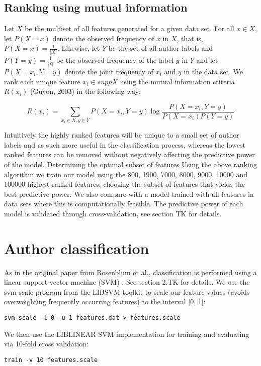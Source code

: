 \documentclass[a4paper,11pt]{kth-mag}
\begin{document}
\subsection{Ranking using mutual information}
Let $X$ be the multiset of all features generated for a given data set. For all
$x \in X$, let $P(X = x)$ denote the observed frequency of $x$ in $X$, that is,
$P(X = x) = \frac{1}{|X|}$. Likewise, let $Y$ be the set of all author labels
and $P(Y = y)= \frac{1}{|Y|}$ be the observed frequency of the label $y$ in $Y$
and let $P(X=x_i,Y=y)$ denote the joint frequency of $x_i$ and $y$ in the data
set. We rank each unique feature $x_i \in supp X $ using the mutual information
criteria $R(x_i)$ (Guyon, 2003) in the following way:

$$R(x_i)= \sum_{x_i \in X, y \in Y} P(X=x_i,Y=y) \log \frac{P(X = x_i,
Y = y)}{P(X = x_i)P(Y = y)}$$

Intuitively the highly ranked features will be unique to a small set of author
labels and as such more useful in the classification process, whereas the
lowest ranked features can be removed without negatively affecting the
predictive power of the model.  Determining the optimal subset of features
Using the above ranking algorithm we train our model using the 800, 1900, 7000,
8000, 9000, 10000 and 100000 highest ranked features, choosing the subset of
features that yields the best predictive power. We also compare with a model
trained with all features in data sets where this is computationally feasible.
The predictive power of each model is validated through cross-validation, see
section TK for details.

\section{Author classification}
As in the original paper from Rosenblum et al., classification is performed
using a linear support vector machine (SVM) \parencite{rosenblum2011wrote}. See
section 2.TK for details. We use the svm-scale program from the LIBSVM toolkit
\parencite{chang2011libsvm} to scale our feature values (avoids overweighting
frequently occurring features) to the interval [0, 1]:
\begin{lstlisting}
svm-scale -l 0 -u 1 features.dat > features.scale
\end{lstlisting}

We then use the LIBLINEAR SVM implementation \parencite{fan2008liblinear} for
training and evaluating via 10-fold cross validation:
\begin{lstlisting}
train -v 10 features.scale
\end{lstlisting}
\end{document}

